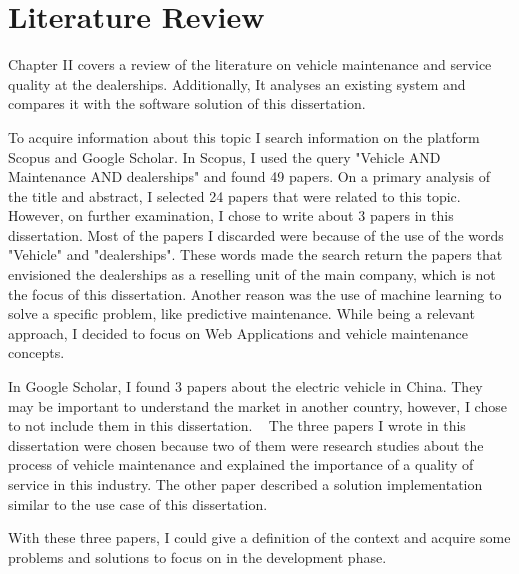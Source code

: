 \chapter{Literature Review}%
\label{chapter:literatureReview}

\begin{introduction}
  Chapter II covers a review of the literature on vehicle maintenance and service quality at the dealerships. 
  Additionally, It analyses an existing system and compares it with the software solution of this dissertation.
\end{introduction} 


To acquire information about this topic I search information on the platform Scopus and Google Scholar. 
In Scopus, I used the query "Vehicle AND Maintenance AND dealerships" and found 49 papers.
On a primary analysis of the title and abstract, I selected 24 papers that were related to this topic.
However, on further examination, I chose to write about 3 papers in this dissertation. 
Most of the papers I discarded were because of the use of the words "Vehicle" and "dealerships". 
These words made the search return the papers that envisioned the dealerships as a reselling unit of the main company, which is not the focus of this dissertation.
Another reason was the use of machine learning to solve a specific problem, like predictive maintenance. 
While being a relevant approach, I decided to focus on Web Applications and vehicle maintenance concepts.

In Google Scholar, I found 3 papers about the electric vehicle in China. 
They may be important to understand the market in another country, however, I chose to not include them in this dissertation.  
The three papers I wrote in this dissertation were chosen because two of them were research studies about the process of vehicle maintenance and explained the importance of a quality of service in this industry.
The other paper described a solution implementation similar to the use case of this dissertation.

With these three papers, I could give a definition of the context and acquire some problems and solutions to focus on in the development phase.  




